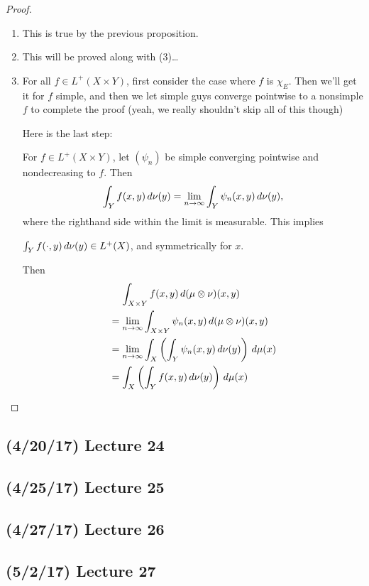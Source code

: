 \documentclass[11pt,leqno,oneside]{amsbook}
\numberwithin{thm}{section}
\newcommand{\x}{\times}
\newcommand{\ox}{\otimes}
\begin{document}
\begin{proof}
  \mbox{}
  \begin{enumerate}[label=(\arabic{*})]
    \item This is true by the previous proposition.
    \item This will be proved along with (3)\ldots
    \item For all $f \in L^+(X \x Y)$, first consider the case where $f$ is $\chi_E$.  Then we'll get it for $f$ simple, and then we let simple guys converge pointwise to a nonsimple $f$ to complete the proof (yeah, we really shouldn't skip all of this though)

    Here is the last step:

    For $f \in L^+(X \x Y)$, let $(\psi_n)$ be simple converging pointwise and nondecreasing to $f$.  Then $$\int_Y f(x,y) \, d\nu(y) = \lim_{n \to \infty} \int_Y \psi_n(x,y) \, d\nu(y),$$ where the righthand side within the limit is measurable.  This implies

    $\int_Y f(\cdot, y) \, d\nu(y) \in L^+(X)$, and symmetrically for $x$.

    Then
    \begin{align*}
      &\quad\, \int_{X \x Y} f(x,y) \d(\mu \ox \nu)(x,y) \\
      &= \lim_{n \to \oo} \int_{X \x Y} \psi_n(x,y) \d(\mu \ox \nu)(x,y) \\
      &= \lim_{n \to \oo} \int_{X} \left(\int_{Y} \psi_n(x,y) \d\nu(y) \right) \d \mu(x) \\
      &= \int_{X} \left(\int_{Y} f(x,y) \d\nu(y) \right) \d \mu(x)
    \end{align*}
  \end{enumerate}
\end{proof}


\subsection*{(4/20/17) Lecture 24}
\subsection*{(4/25/17) Lecture 25}
\subsection*{(4/27/17) Lecture 26}
\subsection*{(5/2/17) Lecture 27}
\end{document}
